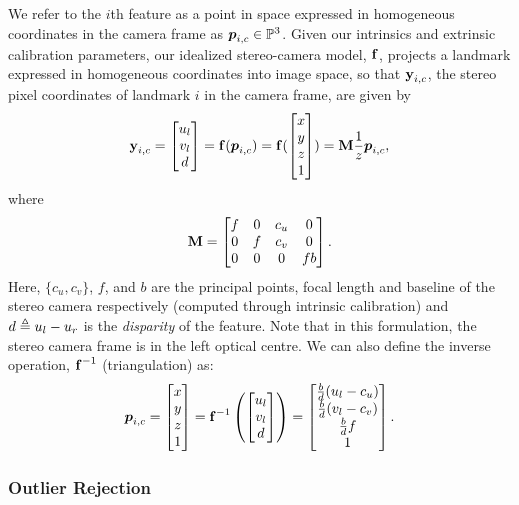 We refer to the $i$th feature as a point in space expressed in homogeneous coordinates in the camera frame as
$\HomogeneousPoint{i}{c} \in
\HomogeneousNumbers[3]$.  Given our intrinsics and extrinsic calibration parameters, our idealized stereo-camera model, $\boldsymbol{\mathbf{f}}$,
projects a landmark expressed in homogeneous coordinates into image space, so
that $\boldsymbol{\mathbf{y}}_{i, c}$, the stereo pixel coordinates of landmark $i$ in the camera frame, are given
by 
 \begin{equation}
	\boldsymbol{\mathbf{y}}_{i, c} = \begin{bmatrix} u_l \\ v_l \\ d  \end{bmatrix}  
  =\boldsymbol{\mathbf{f}}(\boldsymbol{p}_{i,c}) =  \boldsymbol{\mathbf{f}}(\begin{bmatrix} x \\ y \\ z \\ 1 \end{bmatrix}) = 
   \boldsymbol{\mathbf{M}} \frac{1}{z} \boldsymbol{p}_{i,c},
\end{equation}
where
\begin{equation}
\boldsymbol{\mathbf{M}} = \begin{bmatrix} f & 0 & c_u & 0 \\ 0 & f & c_v & 0 \\ 0 & 0 & 0 & fb \end{bmatrix}.
\end{equation}
Here, $\{c_u, c_v\}$, $f$, and $b$ are the principal points, focal
length and baseline of the stereo camera respectively (computed through intrinsic calibration) and $d \triangleq u_l - u_r$ is the \textit{disparity} of the feature. Note that in this
formulation, the stereo camera frame is in the left optical centre. We can also define the inverse operation, $\boldsymbol{\mathbf{f}}^{-1}$ (triangulation) as:
 \begin{equation}
	\boldsymbol{p}_{i,c} = \begin{bmatrix} x \\ y \\ z \\ 1 \end{bmatrix} =  \boldsymbol{\mathbf{f}}^{-1}\left( \begin{bmatrix} u_l \\ v_l \\ d \end{bmatrix} \right) =  \begin{bmatrix}  \frac{b}{d}(u_l - c_u) \\ \frac{b}{d}(v_l - c_v) \\ \frac{b}{d} f \\ 1 \end{bmatrix}.
\end{equation}



\subsubsection{Outlier Rejection}

